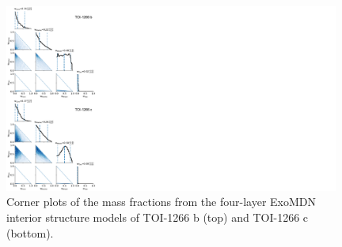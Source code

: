 \documentclass[twocolumn]{aastex631}
\begin{document}
\begin{figure}
\begin{center}
  \includegraphics[width=11.0cm]{ExoMDN_Fig.pdf}
  \caption{Corner plots of the mass fractions from the four-layer ExoMDN interior structure models of TOI-1266 b (top) and TOI-1266 c (bottom).}
  \label{fig:ExoMDN}
\end{center}
\end{figure}



{}



\end{document}
